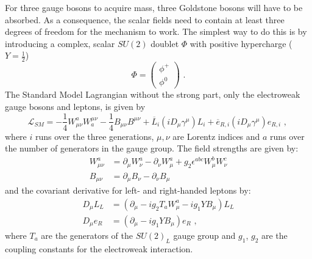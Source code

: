 For three gauge bosons to acquire mass, three Goldstone bosons will have to be absorbed. As a
consequence, the scalar fields need to contain at least three degrees of freedom for the mechanism
to work. The simplest way to do this is by introducing a complex, scalar $SU(2)$ doublet $\Phi$ with
positive hypercharge ($Y = \frac{1}{2}$)
\begin{equation}
  \Phi = \begin{pmatrix} \phi^+ \\ \phi^0 \end{pmatrix} \textrm{ .} 
\end{equation}
The Standard Model Lagrangian without the strong part, \ie only the electroweak gauge bosons and
leptons, is given by
\begin{equation}
  \mathcal{L}_{SM} = - \frac{1}{4}W_{\mu\nu}^aW_a^{\mu\nu} - \frac{1}{4}B_{\mu\nu}B^{\mu\nu} +
\overline{L}_i (iD_\mu\gamma^\mu) L_i + \overline{e}_{R,i} (iD_\mu\gamma^\mu) e_{R,i} \textrm{ , } 
\end{equation}
where $i$ runs over the three generations, $\mu,\nu$ are Lorentz indices and $a$ runs over the
number of generators in the gauge group.
The field strengths are given by:
\begin{align*}
  W_{\mu\nu}^a &= \partial_\mu W_\nu^a - \partial_\nu W_\mu^a + g_2 \epsilon^{abc} W_\mu^b W_\nu^c
\\
  B_{\mu\nu} &= \partial_\mu B_\nu - \partial_\nu B_\mu 
\end{align*}
and the covariant derivative for left- and right-handed leptons by:
\begin{align*}
  D_\mu L_L &= \left(\partial_\mu - i g_2 T_a W_\mu^a - i g_1 Y B_\mu \right) L_L \\
  D_\mu e_R &= \left(\partial_\mu - i g_1 Y B_\mu \right) e_R \textrm{ ,}
\end{align*}
where $T_a$ are the generators of the $SU(2)_L$ gauge group and $g_1$, $g_2$ are the coupling
constants for the electroweak interaction.

